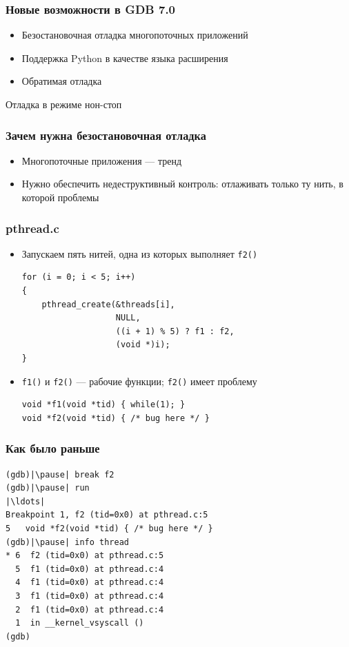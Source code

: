 \documentclass[onlymath]{beamer}
\newcommand\code\texttt
\begin{document}
\begin{frame}
  \frametitle{Новые возможности в GDB 7.0}
  \begin{itemize}
  \item Безостановочная отладка многопоточных приложений
  \item Поддержка Python в качестве языка расширения
  \item Обратимая отладка
  \end{itemize}
\end{frame}

\begin{subsection}{Отладка в режиме нон-стоп}
\begin{frame}
  \frametitle{Зачем нужна безостановочная отладка}
  \begin{itemize}
  \item Многопоточные приложения — тренд
  \item Нужно обеспечить недеструктивный контроль: отлаживать только
    ту нить, в которой проблемы
  \end{itemize}
\end{frame}

\begin{frame}[fragile]
  \frametitle{pthread.c}
  \begin{itemize}
  \item Запускаем пять нитей, одна из которых выполняет \code{f2()}
\begin{lstlisting}
for (i = 0; i < 5; i++)
{
    pthread_create(&threads[i],
                   NULL, 
                   ((i + 1) % 5) ? f1 : f2, 
                   (void *)i);
}
\end{lstlisting}
\item \code{f1()} и \code{f2()} — рабочие функции; \code{f2()} имеет проблему
\begin{lstlisting}
void *f1(void *tid) { while(1); }
void *f2(void *tid) { /* bug here */ }
\end{lstlisting}
  \end{itemize}
\end{frame}

\begin{frame}[fragile]
  \frametitle{Как было раньше}
\begin{lstlisting}[style=gdbsession]
(gdb)|\pause| break f2
(gdb)|\pause| run
|\ldots|
Breakpoint 1, f2 (tid=0x0) at pthread.c:5
5	void *f2(void *tid) { /* bug here */ }
(gdb)|\pause| info thread
* 6  f2 (tid=0x0) at pthread.c:5
  5  f1 (tid=0x0) at pthread.c:4
  4  f1 (tid=0x0) at pthread.c:4
  3  f1 (tid=0x0) at pthread.c:4
  2  f1 (tid=0x0) at pthread.c:4
  1  in __kernel_vsyscall ()
(gdb)
\end{lstlisting}
\end{frame}


\end{subsection}
\end{document}
